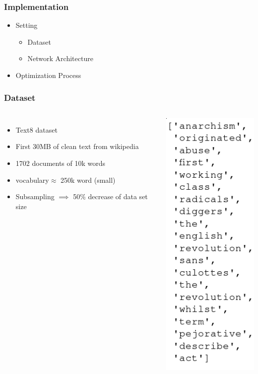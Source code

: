 \begin{frame}\frametitle{Implementation}
\begin{itemize}
\item Setting
\begin{itemize}
\item Dataset 
\item Network Architecture 
\end{itemize}
\item Optimization Process
\end{itemize}
\end{frame}

\begin{frame}
\frametitle{Dataset} 
\begin{columns}
    \begin{itemize}
\item Text8 dataset
\item First 30MB of clean text from wikipedia 
\item 1702 documents of 10k words  
\item vocabulary$\approx$ 250k word (small) 
\item Subsampling $\implies$ 50\% decrease of data set size
\end{itemize}
        \includegraphics[scale=0.35]{images/text8snippet}
  \end{columns}
\end{frame}

